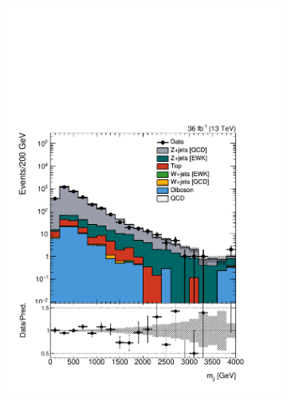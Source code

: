 \begin{figure}[]
\begin{center}
\begin{subfigure}[t]{0.24\textwidth}
            \includegraphics[width=\textwidth]{figures/vbf/prefit/dimuon_jot12Mass_logy.pdf}
        \end{subfigure}
        \begin{subfigure}[t]{0.24\textwidth}

\end{subfigure}
\end{center}
\end{figure}
